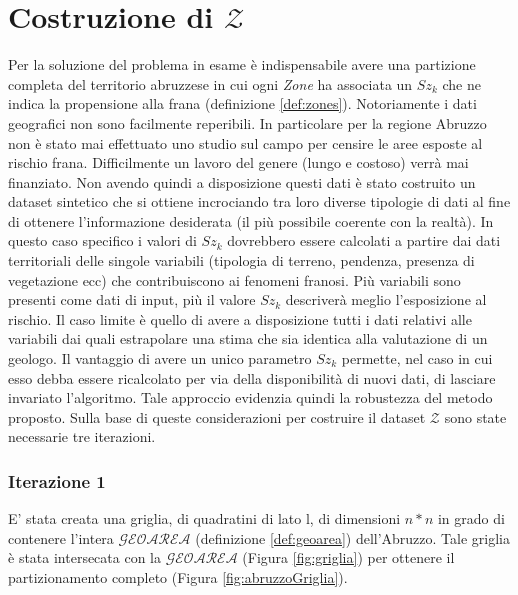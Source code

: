 
\chapter{Costruzione di $\mathcal{Z}$}
Per la soluzione del problema in esame è indispensabile avere una partizione completa del territorio abruzzese in cui ogni \textit{Zone} ha associata un $Sz_k$ che ne indica la propensione alla frana (definizione \ref{def:zones}). Notoriamente i dati geografici non sono facilmente reperibili. In particolare per la regione Abruzzo non è stato mai effettuato uno studio sul campo per censire le aree esposte al rischio frana. Difficilmente un lavoro del genere (lungo e costoso) verrà mai finanziato. Non avendo quindi a disposizione questi dati è stato costruito un dataset sintetico che si ottiene incrociando tra loro diverse tipologie di dati al fine di ottenere l'informazione desiderata (il più possibile coerente con la realtà). In questo caso specifico i valori di $Sz_k$ dovrebbero essere calcolati a partire dai dati territoriali delle singole variabili (tipologia di terreno, pendenza, presenza di vegetazione ecc) che contribuiscono ai fenomeni franosi. Più variabili sono presenti come dati di input, più il valore $Sz_k$ descriverà meglio l'esposizione al rischio. Il caso limite è quello di avere a disposizione tutti i dati relativi alle variabili dai quali estrapolare una stima che sia identica alla valutazione di un geologo. Il vantaggio di avere un unico parametro $Sz_k$ permette, nel caso in cui esso debba essere ricalcolato per via della disponibilità di nuovi dati, di lasciare invariato l'algoritmo. Tale approccio evidenzia quindi la robustezza del metodo proposto. Sulla base di queste considerazioni per costruire il dataset $\mathcal{Z}$ sono state necessarie tre iterazioni.

\subsection{\textbf{Iterazione 1}}
E' stata creata una griglia, di quadratini di lato l, di dimensioni $n*n$ in grado di contenere l'intera  $\mathcal{GEOAREA}$ (definizione \ref{def:geoarea}) dell'Abruzzo. Tale griglia è stata intersecata con la  $\mathcal{GEOAREA}$ (Figura \ref{fig:griglia}) per ottenere il partizionamento completo (Figura \ref{fig:abruzzoGriglia}).  


